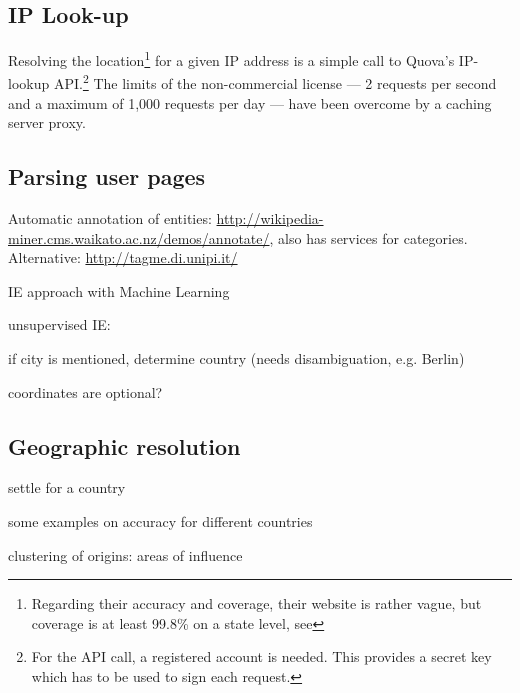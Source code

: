 \subsection{IP Look-up}\label{sub:iplookup}

Resolving the location\footnote{Regarding their accuracy and coverage, their website is rather vague, but coverage is at least 99.8\% on a state level, see } for a given IP address is a simple call to Quova's IP-lookup API.\footnote{For the API call, a registered account is needed. This provides a secret key which has to be used to sign each request.}
The limits of the non-commercial license --- 2 requests per second and a maximum of 1,000 requests per day --- have been overcome by a caching server proxy.


\subsection{Parsing user pages}\label{sub:parsinguserpages}

\begin{todos}
\item Automatic annotation of entities: \url{http://wikipedia-miner.cms.waikato.ac.nz/demos/annotate/}, also has services for categories. Alternative: \url{http://tagme.di.unipi.it/}
    \item IE approach with Machine Learning 
    \item unsupervised IE: 
    \item if city is mentioned, determine country (needs disambiguation, e.g. Berlin)
    \item coordinates are optional?
\end{todos}



\subsection{Geographic resolution}\label{sub:resolution}

\begin{todos}
    \item settle for a country
    \item some examples on accuracy for different countries
    \item clustering of origins: areas of influence
\end{todos}

